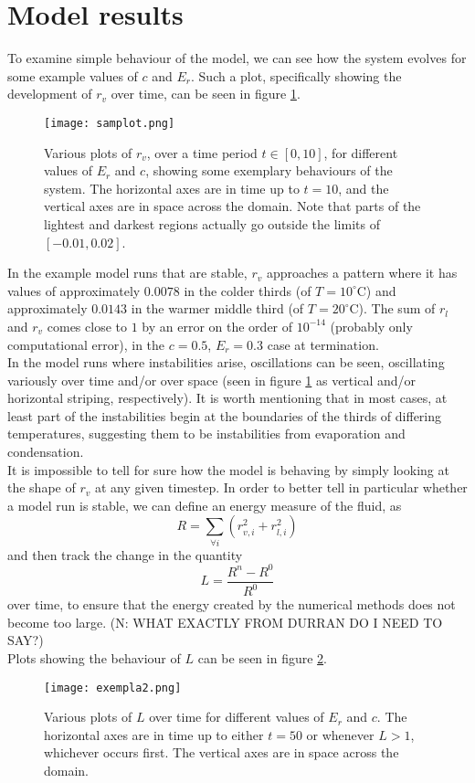 \documentclass[11pt]{article}
\begin{document}
\section{Model results}
To examine simple behaviour of the model, we can see how the system evolves for some example values of $c$ and $E_r$. Such a plot, specifically showing the development of $r_v$ over time, can be seen in figure \ref{fig:samplot}.
\begin{figure}[H]
\centering
\texttt{[image: samplot.png]}
\caption{Various plots of $r_v$, over a time period $t\in[0,10]$, for different values of $E_r$ and $c$, showing some exemplary behaviours of the system. The horizontal axes are in time up to $t=10$, and the vertical axes are in space across the domain. Note that parts of the lightest and darkest regions actually go outside the limits of $[-0.01,0.02]$.}
\label{fig:samplot}
\end{figure}
In the example model runs that are stable, $r_v$ approaches a pattern where it has values of approximately $0.0078$ in the colder thirds (of $T=10^{\circ}$C) and approximately $0.0143$ in the warmer middle third (of $T=20^{\circ}$C). The sum of $r_l$ and $r_v$ comes close to $1$ by an error on the order of $10^{-14}$ (probably only computational error), in the $c=0.5$, $E_r=0.3$ case at termination. \\
In the model runs where instabilities arise, oscillations can be seen, oscillating variously over time and/or over space (seen in figure \ref{fig:samplot} as vertical and/or horizontal striping, respectively). It is worth mentioning that in most cases, at least part of the instabilities begin at the boundaries of the thirds of differing temperatures, suggesting them to be instabilities from evaporation and condensation. \\
It is impossible to tell for sure how the model is behaving by simply looking at the shape of $r_v$ at any given timestep. In order to better tell in particular whether a model run is stable, we can define an energy measure of the fluid, as
\[
R = \sum_{\forall i}\left(r_{v,i}^2+r_{l,i}^2\right)
\]
and then track the change in the quantity
\[
L = \frac{R^n - R^0}{R^0}
\]
over time, to ensure that the energy created by the numerical methods does not become too large. (N: WHAT EXACTLY FROM DURRAN DO I NEED TO SAY?) \\
Plots showing the behaviour of $L$ can be seen in figure \ref{fig:exempla2}.
\begin{figure}[H]
\centering
\texttt{[image: exempla2.png]}
\caption{Various plots of $L$ over time for different values of $E_r$ and $c$. The horizontal axes are in time up to either $t=50$ or whenever $L>1$, whichever occurs first. The vertical axes are in space across the domain.}
\label{fig:exempla2}
\end{figure}
\end{document}

